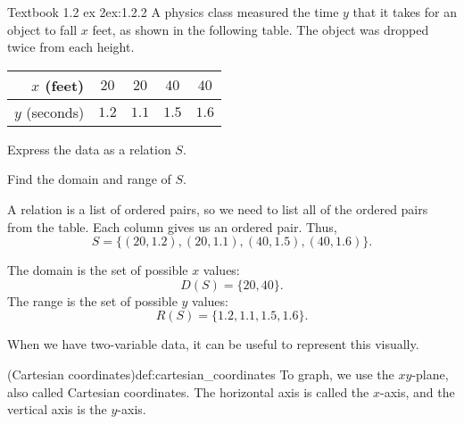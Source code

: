 \documentclass{article}
\begin{document}
\begin{example}{Textbook 1.2 ex 2}{ex:1.2.2}
    A physics class measured the time $y$ that it takes for an object to fall $x$ feet, as shown in the following table. The object was dropped twice from each height.
    \begin{center} 
    \begin{tabular}{|r|c|c|c|c|} \hline
        $x$ (feet) & $20$ & $20$ & $40$ & $40$ \\ \hline
        $y$ (seconds) & $1.2$ & $1.1$ & $1.5$ & $1.6$ \\ \hline
    \end{tabular}\end{center}
    \begin{problem}
        \item Express the data as a relation $S$.
        \item Find the domain and range of $S$.
    \end{problem}
\end{example}
\begin{solution}
    \begin{problem}
        \item A relation is a list of ordered pairs, so we need to list all of the ordered pairs from the table. Each column gives us an ordered pair. Thus, \[S=\bigl\{(20,1.2),(20,1.1),(40,1.5),(40,1.6)\bigr\}.\]
        \item The domain is the set of possible $x$ values: \[D(S)=\{20,40\}.\] The range is the set of possible $y$ values: \[R(S)=\{1.2,1.1,1.5,1.6\}.\]
    \end{problem}
\end{solution}

When we have two-variable data, it can be useful to represent this visually.
\begin{definition}{(Cartesian coordinates)}{def:cartesian_coordinates}
    To graph, we use the $xy$-plane, also called Cartesian coordinates. The horizontal axis is called the $x$-axis, and the vertical axis is the $y$-axis.
    \begin{center}\end{center}
\end{definition}
\end{document}
